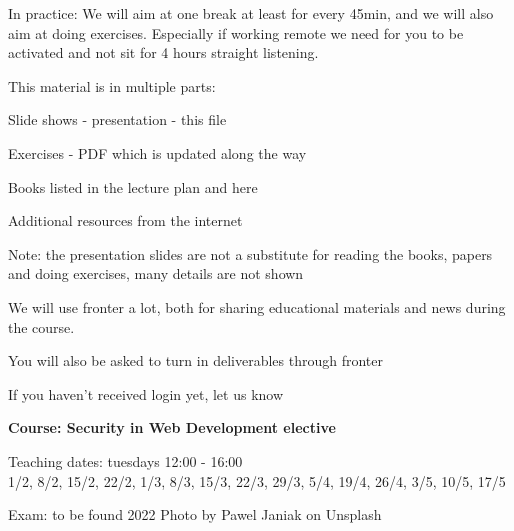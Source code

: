 \documentclass[Screen16to9,17pt]{foils}
\begin{document}
In practice:
We will aim at one break at least for every 45min, and we will also aim at doing exercises. Especially if working remote we need for you to be activated and not sit for 4 hours straight listening.



\begin{list1}
\item This material is in multiple parts:
\begin{list2}
\item Slide shows - presentation - this file
\item Exercises - PDF which is updated along the way
\end{list2}
\item Books listed in the lecture plan and here
\item Additional resources from the internet
\end{list1}

Note: the presentation slides are not a substitute for reading the books, papers and doing exercises, many details are not shown




We will use fronter a lot, both for sharing educational materials and news during the course.

You will also be asked to turn in deliverables through fronter


\vskip 5mm
\centerline{If you haven't received login yet, let us know}






{\Large\bf Course: Security in Web Development elective}

Teaching dates: tuesdays 12:00 - 16:00\\
1/2, 8/2, 15/2, 22/2, 1/3, 8/3, 15/3, 22/3, 29/3, 5/4, 19/4, 26/4, 3/5, 10/5, 17/5

Exam: to be found 2022 \hskip 12cm Photo by Pawel Janiak on Unsplash

\end{document}
